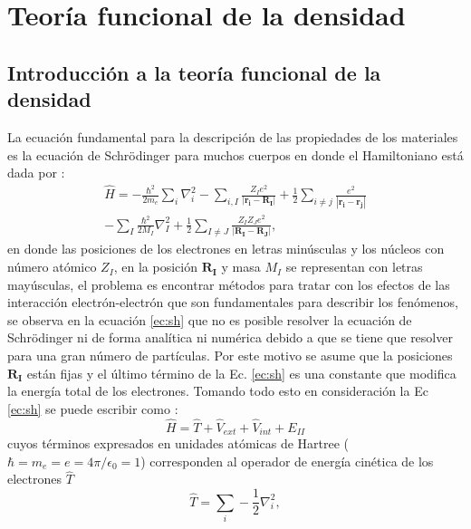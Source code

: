 \chapter{Teor\'ia funcional de la densidad} \label{cap:DFT}
	
	\section{Introducci\'on a la teor\'ia funcional de la densidad} \label{sec:introdft}
	
	La ecuaci\'on fundamental para la descripci\'on de  las propiedades de los materiales es la ecuaci\'on  de  Schr\"odinger para muchos cuerpos en donde el Hamiltoniano est\'a dada por \cite{Faustino-2014}: 
	\begin{multline}
	\hat H = - \frac{\hbar ^2}{2 m_e} \sum_{i} \nabla_{i}^2 - \sum_{i,I} \frac{Z_I e^2}{\vert \pmb{r_i} - \pmb{R_I} \vert}+ \frac{1}{2} \sum_{i \not= j}  \frac{e^2}{|\pmb{r_i} - \pmb{r_j} |}\\
	- \sum_{I} \frac{\hbar^2}{2 M_I} \nabla_I^2 + \frac{1}{2} \sum_{I \not= J} \frac{Z_I Z_J e^2}{|\pmb{R_I}-\pmb{R_J}|},  \label{ec:sh} 
	\end{multline}	
	\newline
	en donde las posiciones de los electrones en letras min\'usculas y los n\'ucleos con n\'umero at\'omico  $Z_I$, en la posici\'on $\pmb{R_I}$ y masa $M_I$ se representan con letras may\'usculas, el problema es encontrar m\'etodos para tratar con  los efectos de las interacci\'on  electr\'on-electr\'on que son fundamentales para describir los fenómenos, se observa en la ecuaci\'on \ref{ec:sh}  que no es posible resolver la ecuaci\'on de Schr\"odinger ni de forma anal\'itica ni num\'erica debido a que se tiene que resolver para una gran n\'umero de part\'iculas. Por este motivo se asume que la posiciones $\pmb{R_I}$ est\'an fijas y el \'ultimo t\'ermino de la Ec. \ref{ec:sh} es una constante que modifica la energ\'ia total de los electrones.
	\newline
	Tomando todo esto en consideraci\'on la Ec \ref{ec:sh} se puede escribir como \cite{Faustino-2014}:
	 \begin{equation}
	 \hat H = \hat T + \hat V_{ext} + \hat V_{int}+E_{II} \label{ec:shelectron}
	 \end{equation}
	cuyos t\'erminos expresados en unidades at\'omicas de Hartree ($\hbar = m_{e} = e= 4\pi / \epsilon_0 =1 $)  corresponden al operador de energ\'ia cin\'etica de los electrones $\hat T$
	\begin{equation}
	\hat{T} = \sum_{i} -\frac{1}{2} \nabla_{i}^2 ,\label{ec:shT}
	\end{equation}
